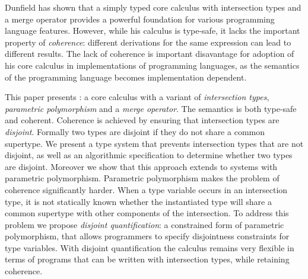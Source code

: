 Dunfield has shown that a simply typed core calculus with
intersection types and a merge operator provides a powerful foundation
for various programming language features. However, while his calculus
is type-safe, it lacks the important property of \emph{coherence}:
different derivations for the same expression can lead to different
results. The lack of coherence is important disavantage for adoption
of his core calculus in implementations of programming languages, as
the semantics of the programming language becomes implementation
dependent.

This paper presents \name: a core calculus with a variant of
\emph{intersection types}, \emph{parametric polymorphism} and a
\emph{merge operator}. The semantics \name is both type-safe and
coherent. Coherence is achieved by ensuring that intersection types
are \emph{disjoint}. Formally two types are disjoint if they do not
share a common supertype. We present a type system that prevents
intersection types that are not disjoint, as well as an algorithmic
specification to determine whether two types are disjoint. Moreover we
show that this approach extends to systems with parametric
polymorphism. Parametric polymorphism makes the problem of coherence
significantly harder. When a type variable occurs in an intersection
type, it is not statically known whether the instantiated type will
share a common supertype with other components of the intersection.
To address this problem we propose \emph{disjoint quantification}: a
constrained form of parametric polymorphism, that allows programmers
to specify disjointness constraints for type variables. With disjoint
quantification the calculus remains very flexible in terms of programs 
that can be written with intersection types, while retaining coherence.
